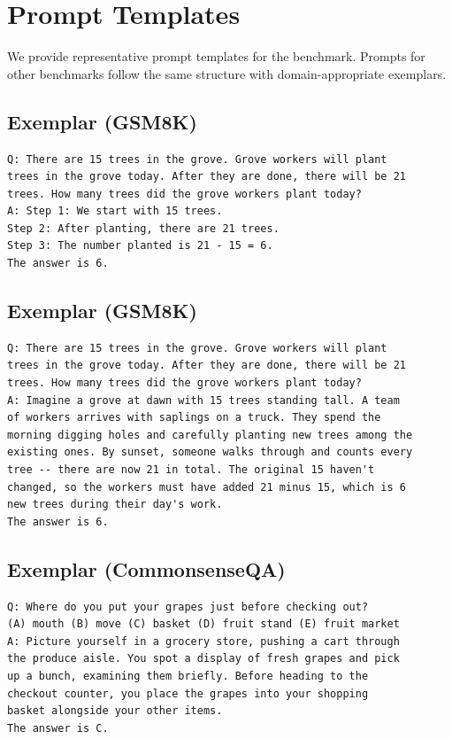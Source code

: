 \section{Prompt Templates}
\label{sec:appendix_prompts}

We provide representative prompt templates for the \gsm benchmark. Prompts for other benchmarks follow the same structure with domain-appropriate exemplars.

\subsection{\fewshotcot Exemplar (GSM8K)}

\begin{lstlisting}
Q: There are 15 trees in the grove. Grove workers will plant
trees in the grove today. After they are done, there will be 21
trees. How many trees did the grove workers plant today?
A: Step 1: We start with 15 trees.
Step 2: After planting, there are 21 trees.
Step 3: The number planted is 21 - 15 = 6.
The answer is 6.
\end{lstlisting}

\subsection{\storycot Exemplar (GSM8K)}

\begin{lstlisting}
Q: There are 15 trees in the grove. Grove workers will plant
trees in the grove today. After they are done, there will be 21
trees. How many trees did the grove workers plant today?
A: Imagine a grove at dawn with 15 trees standing tall. A team
of workers arrives with saplings on a truck. They spend the
morning digging holes and carefully planting new trees among the
existing ones. By sunset, someone walks through and counts every
tree -- there are now 21 in total. The original 15 haven't
changed, so the workers must have added 21 minus 15, which is 6
new trees during their day's work.
The answer is 6.
\end{lstlisting}

\subsection{\storycot Exemplar (CommonsenseQA)}

\begin{lstlisting}
Q: Where do you put your grapes just before checking out?
(A) mouth (B) move (C) basket (D) fruit stand (E) fruit market
A: Picture yourself in a grocery store, pushing a cart through
the produce aisle. You spot a display of fresh grapes and pick
up a bunch, examining them briefly. Before heading to the
checkout counter, you place the grapes into your shopping
basket alongside your other items.
The answer is C.
\end{lstlisting}

